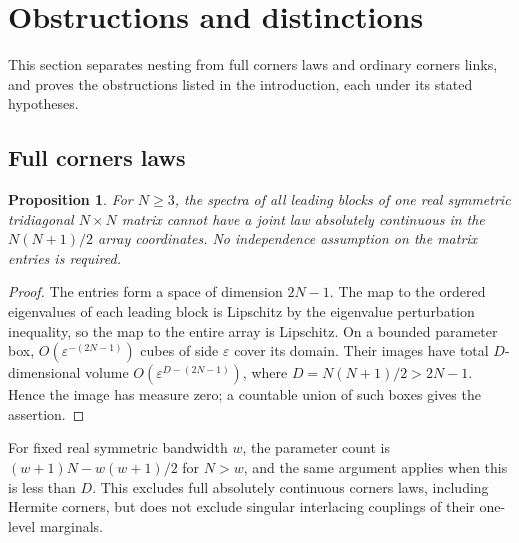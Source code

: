 \documentclass[10pt]{amsart}
\newtheorem{proposition}[theorem]{Proposition}
\begin{document}
\section{Obstructions and distinctions}
This section separates nesting from full corners laws and ordinary
corners links, and proves the obstructions listed in the introduction,
each under its stated hypotheses.

\subsection{Full corners laws}
\begin{proposition}\label{prop:dimension}
For $N\geq3$, the spectra of all leading blocks of one real symmetric
tridiagonal $N\times N$ matrix cannot have a joint law absolutely
continuous in the $N(N+1)/2$ array coordinates. No independence
assumption on the matrix entries is required.
\end{proposition}
\begin{proof}
The entries form a space of dimension $2N-1$. The map to the ordered
eigenvalues of each leading block is Lipschitz by the eigenvalue
perturbation inequality, so the map to the entire array is Lipschitz.
On a bounded parameter box, $O(\varepsilon^{-(2N-1)})$ cubes of
side $\varepsilon$ cover its domain. Their images have total
$D$-dimensional volume $O(\varepsilon^{D-(2N-1)})$, where
$D=N(N+1)/2>2N-1$. Hence the image has measure zero; a countable
union of such boxes gives the assertion.
\end{proof}
For fixed real symmetric bandwidth $w$, the parameter count is
$(w+1)N-w(w+1)/2$ for $N>w$, and the same argument applies when
this is less than $D$. This excludes full absolutely continuous
corners laws, including Hermite corners, but does not exclude
singular interlacing couplings of their one-level marginals.
\end{document}
